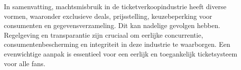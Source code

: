 \vspace{10 mm}
In samenvatting, machtsmisbruik in de ticketverkoopindustrie heeft diverse vormen, waaronder exclusieve deals, prijsstelling, keuzebeperking voor consumenten en gegevensverzameling. 
Dit kan nadelige gevolgen hebben. 
Regelgeving en transparantie zijn cruciaal om eerlijke concurrentie, consumentenbescherming en integriteit in deze industrie te waarborgen. 
Een evenwichtige aanpak is essentieel voor een eerlijk en toegankelijk ticketsysteem voor alle fans.